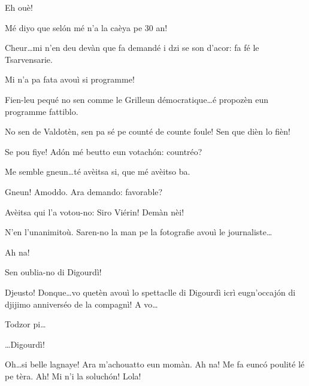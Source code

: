 \begin{drama}
\Ronnyspeaks Eh ouè!

\Laurentspeaks Mé diyo que sel\'on mé n'a la caèya pe 30 an!

\Ronnyspeaks Cheur\ldots mi n'en deu devàn que fa demandé i dzi se son d'acor: fa fé le Tsarvensarie.

\Laurentspeaks Mi n'a pa fata avouì si programme!

\Ronnyspeaks Fien-leu pequé no sen comme le Grilleun démocratique\ldots é propozèn eun programme fattiblo.

\Laurentspeaks No sen de Valdotèn, sen pa sé pe counté de counte foule! Sen que dièn lo fièn!

\Ronnyspeaks Se pou fiye! Ad\'on mé beutto eun votach\'on: countréo?


\Laurentspeaks Me semble gneun\ldots té avèitsa si, que mé avèitso ba.

\Ronnyspeaks Gneun! Amoddo. Ara demando: favorable?


\Laurentspeaks Avèitsa qui l'a votou-no: Siro Viérin! Demàn nèi!

\Ronnyspeaks N'en l'unanimitoù. Saren-no la man pe la fotografie avouì le journaliste\ldots


\Laurentspeaks Ah na!


\Ronnyspeaks Sen oublia-no di Digourdì!

\Laurentspeaks Djeusto! Donque\ldots vo quetèn avouì lo spettaclle di Digourdì icrì eugn'occaj\'on di djijimo anniverséo de la compagnì! A vo\ldots

\Ronnyspeaks Todzor pi\ldots

\Tcheuttespeaks \ldots Digourdì!

\act[Acte I]

\ridoiver



\Maganspeaks {} Oh\ldots si belle lagnaye! Ara m'achouatto eun momàn. Ah na! Me fa euncó poulité lé pe tèra. Ah! Mi n'i la soluch\'on! Lola!


\end{drama}
